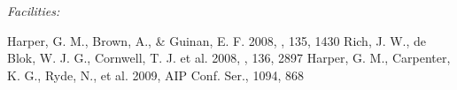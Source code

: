 \documentclass[manuscript]{aastex}
\begin{document}

{\it Facilities:} 





\begin{thebibliography}{}
 Harper, G. M., Brown, A., & Guinan, E. F. 2008, \aj, 135, 1430
 Rich, J. W., de Blok, W. J. G., Cornwell, T. J. et al. 2008, \aj, 136, 2897
 Harper, G. M., Carpenter, K. G., Ryde, N., et al. 2009, AIP Conf. Ser., 1094, 868

\end{thebibliography}
\end{document}
